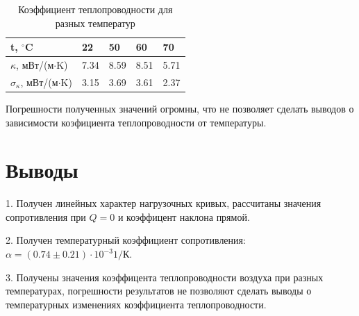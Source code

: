 \documentclass[a4paper,12pt]{article} %
\begin{document}
\begin{table}[h!]
\caption{Коэффициент теплопроводности для разных температур}
\label{кси}
\begin{tabular}{|l|l|l|l|l|}
\hline
t, $^\circ$C                     & 22   & 50    & 60   & 70   \\ \hline
$\kappa$, мВт/(м$\cdot$K)        & 7.34 & 8.59 & 8.51 & 5.71 \\ \hline
$\sigma_\kappa$, мВт/(м$\cdot$K) & 3.15 & 3.69  & 3.61 & 2.37 \\ \hline
\end{tabular}
\end{table}


Погрешности полученных значений огромны, что не позволяет сделать выводов о зависимости коэфициента теплопроводности от температуры.

\section{Выводы}

\hspace{5mm}
1. Получен линейных характер нагрузочных кривых, рассчитаны значения сопротивления при $Q=0$ и коэффицент наклона прямой.

2. Получен температурный коэффициент сопротивления: $\alpha=(0.74 \pm 0.21)\cdot 10^{-3}  1/К$.

3. Получены значения коэффицента теплопроводности воздуха при разных температурах, погрешности результатов не позволяют сделать выводы о температурных изменениях коэффициента теплопроводности.
\end{document}
